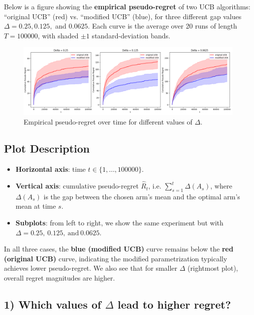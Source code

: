 Below is a figure showing the \textbf{empirical pseudo-regret} of two UCB algorithms: ``original UCB'' (red) vs. ``modified UCB'' (blue), for three different gap values \( \Delta = 0.25, 0.125, \) and \( 0.0625 \). Each curve is the average over 20 runs of length \( T=100000 \), with shaded \( \pm1 \) standard-deviation bands.

\begin{figure}[h]
    \centering
    \includegraphics[width=\textwidth]{plots.png}
    \caption{Empirical pseudo-regret over time for different values of \( \Delta \).}
\end{figure}

\subsection{Plot Description}

\begin{itemize}
    \item \textbf{Horizontal axis}: time \( t\in\{1,\dots,100000\} \).
    \item \textbf{Vertical axis}: cumulative pseudo-regret \( \widehat{R}_t \), i.e. \( \sum_{s=1}^t\Delta(A_s) \), where \( \Delta(A_s) \) is the gap between the chosen arm’s mean and the optimal arm’s mean at time \( s \).
    \item \textbf{Subplots}: from left to right, we show the same experiment but with \( \Delta=0.25,\ 0.125,\ \text{and}\ 0.0625 \).
\end{itemize}

In all three cases, the \textbf{blue (modified UCB)} curve remains below the \textbf{red (original UCB)} curve, indicating the modified parametrization typically achieves lower pseudo-regret. We also see that for smaller \( \Delta \) (rightmost plot), overall regret magnitudes are higher.

\subsection{1) Which values of \( \Delta \) lead to higher regret?}

